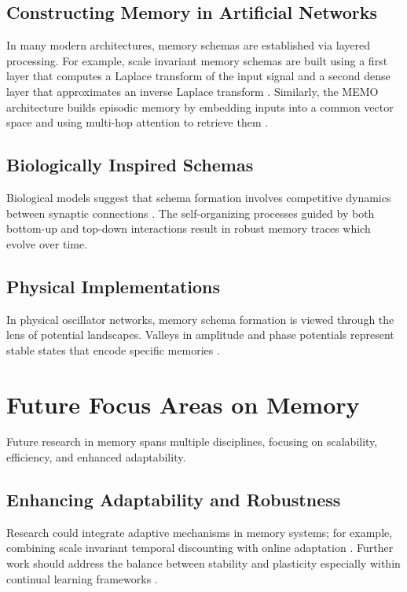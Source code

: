 \documentclass{article}
\begin{document}
\subsection{Constructing Memory in Artificial Networks}
In many modern architectures, memory schemas are established via layered processing. For example, scale invariant memory schemas are built using a first layer that computes a Laplace transform of the input signal and a second dense layer that approximates an inverse Laplace transform \parencite{kabir2024deepreinforcementlearningtimescale}. Similarly, the MEMO architecture builds episodic memory by embedding inputs into a common vector space and using multi-hop attention to retrieve them \parencite{banino2020memodeepnetworkflexible}.

\subsection{Biologically Inspired Schemas}
Biological models suggest that schema formation involves competitive dynamics between synaptic connections \parencite{wakeling2004adaptivityperlearning, jitsev2010experiencedrivenformationpartsbasedrepresentations}. The self-organizing processes guided by both bottom-up and top-down interactions result in robust memory traces which evolve over time.

\subsection{Physical Implementations}
In physical oscillator networks, memory schema formation is viewed through the lens of potential landscapes. Valleys in amplitude and phase potentials represent stable states that encode specific memories \parencite{hoppensteadt2020frequencyphasepotentialforcedstno}.

\section{Future Focus Areas on Memory}
\label{sec:future}
Future research in memory spans multiple disciplines, focusing on scalability, efficiency, and enhanced adaptability.

\subsection{Enhancing Adaptability and Robustness}
Research could integrate adaptive mechanisms in memory systems; for example, combining scale invariant temporal discounting with online adaptation \parencite{kabir2024deepreinforcementlearningtimescale, rannentriki2024revisitingdynamicevaluationonline}. Further work should address the balance between stability and plasticity especially within continual learning frameworks \parencite{schillaci2020predictionerrordrivenmemoryconsolidation, bai2022saliencyaugmentedmemorycompletioncontinual}.
\end{document}
